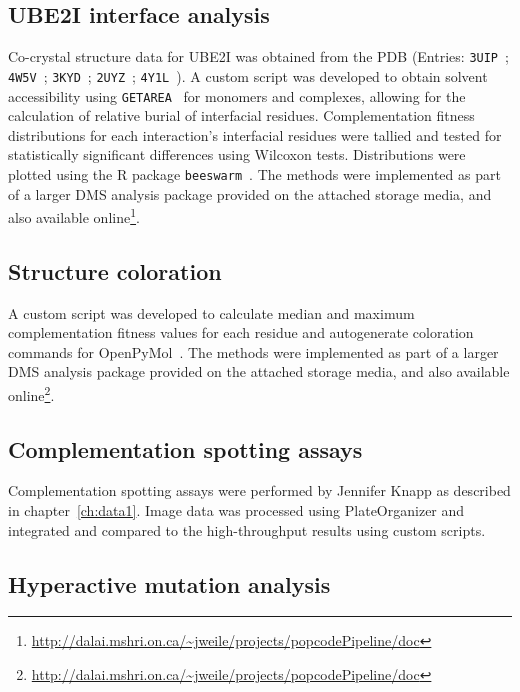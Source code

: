 \subsection{UBE2I interface analysis}
Co-crystal structure data for UBE2I was obtained from the PDB (Entries: \texttt{3UIP}~\cite{gareau_determinants_2012}; \texttt{4W5V}~\cite{reiter_characterization_2016}; \texttt{3KYD}~\cite{olsen_active_2010}; \texttt{2UYZ}~\cite{knipscheer_noncovalent_2007}; \texttt{4Y1L}~\cite{alontaga_rwd_2015}). A custom script was developed to obtain solvent accessibility using \texttt{GETAREA}~\cite{fraczkiewicz_exact_1998} for monomers and complexes, allowing for the calculation of relative burial of interfacial residues. Complementation fitness distributions for each interaction's interfacial residues were tallied and tested for statistically significant differences using Wilcoxon tests. Distributions were plotted using the R package \texttt{beeswarm}~\cite{eklund_bee_2016}. The methods were implemented as part of a larger DMS analysis package provided on the attached storage media, and also available online\footnote{\url{http://dalai.mshri.on.ca/~jweile/projects/popcodePipeline/doc}}.


\subsection{Structure coloration} A custom script was developed to calculate median and maximum complementation fitness values for each residue and autogenerate coloration commands for OpenPyMol~\cite{schrodinger_pymol_2016}. The methods were implemented as part of a larger DMS analysis package provided on the attached storage media, and also available online\footnote{\url{http://dalai.mshri.on.ca/~jweile/projects/popcodePipeline/doc}}.

\subsection{Complementation spotting assays} Complementation spotting assays were performed by Jennifer Knapp as described in chapter~\ref{ch:data1}. Image data was processed using PlateOrganizer and integrated and compared to the high-throughput results using custom scripts.

\subsection{Hyperactive mutation analysis}
